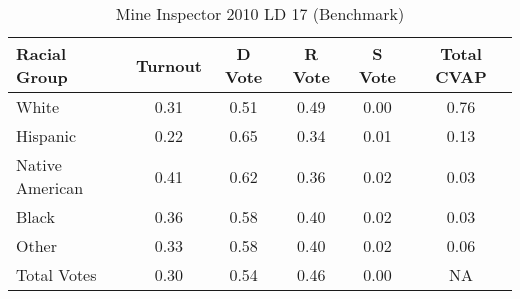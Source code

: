 \begin{table}[htb]
\begin{center}
\caption{Mine Inspector 2010 LD 17 (Benchmark)}
\label{smine_cvap_ld_17_benchmark}
\begin{tabular}{lccccc}
  \hline
Racial Group & Turnout & D Vote & R Vote & S Vote & Total CVAP \\ 
  \hline
    White & 0.31  & 0.51  & 0.49  & 0.00  & 0.76 \\
    Hispanic & 0.22  & 0.65  & 0.34  & 0.01  & 0.13 \\
    Native American & 0.41  & 0.62  & 0.36  & 0.02  & 0.03 \\
    Black & 0.36  & 0.58  & 0.40  & 0.02  & 0.03 \\
    Other & 0.33  & 0.58  & 0.40  & 0.02  & 0.06 \\
    Total Votes & 0.30  & 0.54  & 0.46  & 0.00  &  NA \\
   \hline
\end{tabular}
\end{center}
\end{table}
